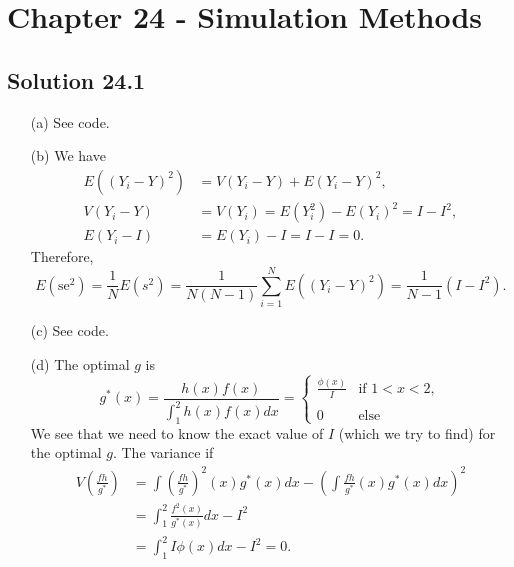 \section*{Chapter 24 - Simulation Methods}

\subsection*{Solution 24.1}

\begin{itemize}
    \item[(a)] See code.
    \item[(b)] We have
        \begin{equation*}
            \begin{split}
                E((Y_i - Y)^2) &= V(Y_i - Y) + E(Y_i - Y)^2, \\
                V(Y_i - Y) &= V(Y_i) = E(Y_i^2) - E(Y_i)^2 = I - I^2, \\
                E(Y_i - I) &= E(Y_i) - I = I - I = 0.
            \end{split}
        \end{equation*}
        Therefore,
        \begin{equation*}
            E(\mathrm{se}^2) = \frac{1}{N} E(s^2)
                = \frac{1}{N (N - 1)} \sum_{i = 1}^N E((Y_i - Y)^2)
                = \frac{1}{N - 1} (I - I^2).
        \end{equation*}
    \item[(c)] See code.
    \item[(d)] The optimal $g$ is
        \begin{equation*}
            g^*(x) = \frac{h(x) f(x)}{\int_1^2 h(x) f(x) dx}
                = \left\{ \begin{matrix}
                    \frac{\phi(x)}{I} & \text{if } 1 < x < 2, \\ \\
                    0 & \text{else}
                \end{matrix} \right.
        \end{equation*}
        We see that we need to know the exact value of $I$ (which we try to find) for the optimal $g$.
        The variance if
        \begin{equation*}
            \begin{split}
                V\left(\frac{f h}{g^*}\right)
                    &= \int \left(\frac{fh}{g^*}\right)^2(x) g^*(x) dx - \left( \int \frac{fh}{g^*}(x) g^*(x) dx \right)^2 \\
                    &= \int_1^2 \frac{f^2(x)}{g^*(x)} dx - I^2 \\
                    &= \int_1^2 I \phi(x) dx - I^2
                    = 0.
            \end{split}
        \end{equation*}
\end{itemize}


